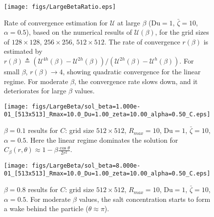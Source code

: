 \documentclass[MSc,beforeExam]{iitcsthesis}
\newcommand\Du{\text{Du}}
\newcommand\cU{\mathscr{U}}
\begin{document}
\begin{figure}
    \begin{center}
    \texttt{[image: figs/LargeBetaRatio.eps]}
        \caption[Rate of convergence estimation for $\cU$ at large $\beta$]
        {Rate of convergence estimation for $\cU$ at large $\beta$  
        ($\Du = 1$, $\bar\zeta = 10$, $\alpha = 0.5$), 
        based on the numerical results of $\cU(\beta)$, for the grid sizes of 
        $128 \times 128$, $256 \times 256$, $512 \times 512$. 
        The rate of convergence $r(\beta)$ is estimated by 
        $r(\beta) \triangleq \left(\cU^{4h}(\beta) - \cU^{2h}(\beta)\right)/\left(\cU^{2h}(\beta) - \cU^{h}(\beta)\right)$.
        For small $\beta$, $r(\beta) \rightarrow 4$, showing 
        quadratic convergence for the linear regime. 
        For moderate $\beta$, the convergence rate slows down, 
        and it deteriorates for large $\beta$ values.
        }
	    \label{fig:LargeBetaRatio}
    \end{center}
\end{figure}

\begin{figure}
    \begin{center}
    \texttt{[image: figs/LargeBeta/sol\_beta=1.000e-01\_[513x513]\_Rmax=10.0\_Du=1.00\_zeta=10.00\_alpha=0.50\_C.eps]}
        \caption[$\beta = 0.1$ results for $C$]
        {$\beta = 0.1$ results for $C$: grid size $512 \times 512$, 
        $R_{max} = 10$, $\Du = 1$, $\bar\zeta = 10$, $\alpha = 0.5$.
        Here the linear regime dominates the solution for 
        $C_\beta(r, \theta) \approx 1 - \beta \frac{\cos\theta}{2r^2}$.}
	    \label{fig:LargeBeta_C1}	    
    \end{center}
\end{figure}

\begin{figure}
    \begin{center}
    \texttt{[image: figs/LargeBeta/sol\_beta=8.000e-01\_[513x513]\_Rmax=10.0\_Du=1.00\_zeta=10.00\_alpha=0.50\_C.eps]}
        \caption[$\beta = 0.8$ results for $C$]
        {$\beta = 0.8$ results for $C$: grid size $512 \times 512$, 
        $R_{max} = 10$, $\Du = 1$, $\bar\zeta = 10$, $\alpha = 0.5$.
        For moderate $\beta$ values, the salt concentration starts
        to form a wake behind the particle ($\theta \approx \pi$).}
	    \label{fig:LargeBeta_C2}	    
    \end{center}
\end{figure}
\end{document}
